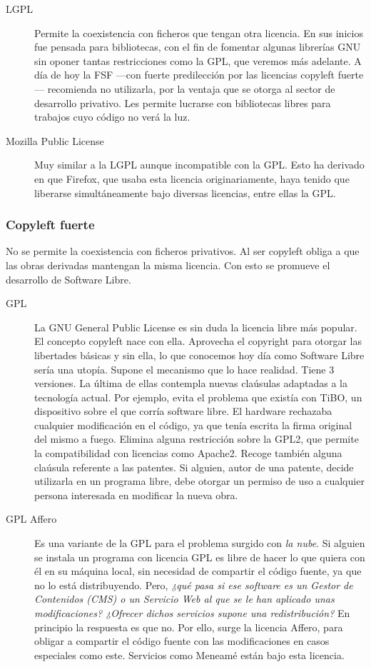 \begin{description}
\item[LGPL] Permite la coexistencia con ficheros que tengan otra
  licencia. En sus inicios fue pensada para bibliotecas, con el fin de
  fomentar algunas librerías GNU sin oponer tantas restricciones como
  la GPL, que veremos más adelante. A día de hoy la FSF ---con fuerte
  predilección por las licencias copyleft fuerte--- recomienda no
  utilizarla, por la ventaja que se otorga al sector de desarrollo
  privativo. Les permite lucrarse con bibliotecas libres para trabajos
  cuyo código no verá la luz.
\item[Mozilla Public License] Muy similar a la LGPL aunque
  incompatible con la GPL. Esto ha derivado en que Firefox, que usaba
  esta licencia originariamente, haya tenido que liberarse
  simultáneamente bajo diversas licencias, entre ellas la GPL.
\end{description}

\subsubsection{Copyleft fuerte}

No se permite la coexistencia con ficheros privativos. Al ser copyleft
obliga a que las obras derivadas mantengan la misma licencia. Con esto
se promueve el desarrollo de Software Libre.

\begin{description}
\item[GPL] La GNU General Public License es sin duda la licencia libre
  más popular. El concepto copyleft nace con ella. Aprovecha el
  copyright para otorgar las libertades básicas y sin ella, lo que
  conocemos hoy día como Software Libre sería una utopía. Supone el
  mecanismo que lo hace realidad. Tiene 3 versiones. La última de
  ellas contempla nuevas claúsulas adaptadas a la tecnología
  actual. Por ejemplo, evita el problema que existía con TiBO, un
  dispositivo sobre el que corría software libre. El hardware
  rechazaba cualquier modificación en el código, ya que tenía escrita
  la firma original del mismo a fuego. Elimina alguna restricción
  sobre la GPL2, que permite la compatibilidad con licencias como
  Apache2. Recoge también alguna claúsula referente a las patentes. Si
  alguien, autor de una patente, decide utilizarla en un programa
  libre, debe otorgar un permiso de uso a cualquier persona interesada
  en modificar la nueva obra.
\item[GPL Affero] Es una variante de la GPL para el problema surgido
  con \emph{la nube}. Si alguien se instala un programa con licencia
  GPL es libre de hacer lo que quiera con él en su máquina local, sin
  necesidad de compartir el código fuente, ya que no lo está
  distribuyendo. Pero, \emph{¿qué pasa si ese software es un Gestor de
    Contenidos (CMS) o un Servicio Web al que se le han aplicado unas
    modificaciones? ¿Ofrecer dichos servicios supone una
    redistribución?}  En principio la respuesta es que no. Por ello,
  surge la licencia Affero, para obligar a compartir el código fuente
  con las modificaciones en casos especiales como este. Servicios como
  Meneamé están bajo esta licencia.
\end{description}

